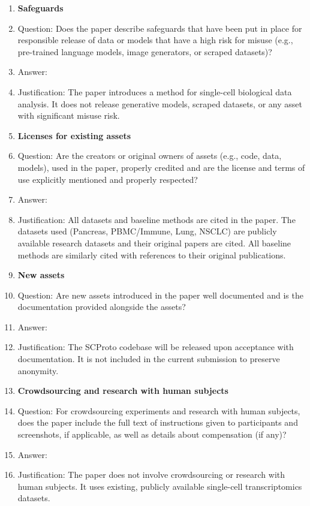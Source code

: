 \begin{enumerate}
\item {\bf Safeguards}
    \item[] Question: Does the paper describe safeguards that have been put in place for responsible release of data or models that have a high risk for misuse (e.g., pre-trained language models, image generators, or scraped datasets)?
    \item[] Answer: \answerNA{}
    \item[] Justification: The paper introduces a method for single-cell biological data analysis. It does not release generative models, scraped datasets, or any asset with significant misuse risk.

\item {\bf Licenses for existing assets}
    \item[] Question: Are the creators or original owners of assets (e.g., code, data, models), used in the paper, properly credited and are the license and terms of use explicitly mentioned and properly respected?
    \item[] Answer: \answerYes{}
    \item[] Justification: All datasets and baseline methods are cited in the paper. The datasets used (Pancreas, PBMC/Immune, Lung, NSCLC) are publicly available research datasets and their original papers are cited. All baseline methods are similarly cited with references to their original publications.

\item {\bf New assets}
    \item[] Question: Are new assets introduced in the paper well documented and is the documentation provided alongside the assets?
    \item[] Answer: \answerNo{}
    \item[] Justification: The SCProto codebase will be released upon acceptance with documentation. It is not included in the current submission to preserve anonymity.

\item {\bf Crowdsourcing and research with human subjects}
    \item[] Question: For crowdsourcing experiments and research with human subjects, does the paper include the full text of instructions given to participants and screenshots, if applicable, as well as details about compensation (if any)?
    \item[] Answer: \answerNA{}
    \item[] Justification: The paper does not involve crowdsourcing or research with human subjects. It uses existing, publicly available single-cell transcriptomics datasets.


\end{enumerate}

